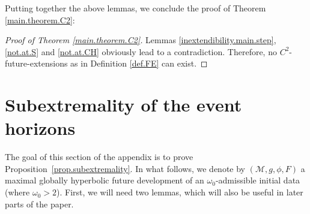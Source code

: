 \documentclass[10pt, reqno]{amsart}
\theoremstyle{definition}
\theoremstyle{remark}
\numberwithin{equation}{section}
\newcommand{\0}{\emptyset}
\newcommand{\omg}{\omega}
\newcommand{\calM}{\mathcal M}
\begin{document}
Putting together the above lemmas, we conclude the proof of Theorem \ref{main.theorem.C2}:
\begin{proof}[Proof of Theorem \ref{main.theorem.C2}]
Lemmas \ref{inextendibility.main.step}, \ref{not.at.S} and \ref{not.at.CH} obviously lead to a contradiction. Therefore, no $C^2$-future-extensions as in Definition \ref{def.FE} can exist.
\end{proof}


\appendix

\section{Subextremality of the event horizons}\label{sec.subext.pf}
The goal of this section of the appendix is to prove Proposition~\ref{prop.subextremality}. In what follows, we denote by $(\calM, g, \phi, F)$ a maximal globally hyperbolic future development of an $\omg_{0}$-admissible initial data (where $\omg_{0} > 2$). First, we will need two lemmas, which will also be useful in later parts of the paper. 
\end{document}
